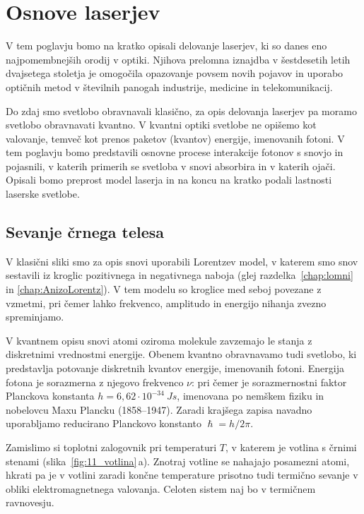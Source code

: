 
\chapter{Osnove laserjev}
V tem poglavju bomo na kratko opisali delovanje laserjev, ki so 
danes eno najpomembnejših orodij v optiki. Njihova prelomna
iznajdba v šestdesetih letih dvajsetega stoletja je omogočila
opazovanje povsem novih pojavov in uporabo optičnih metod
v številnih panogah industrije, medicine in telekomunikacij.

Do zdaj smo svetlobo obravnavali klasično, za
opis delovanja laserjev pa moramo svetlobo obravnavati kvantno. V kvantni optiki 
svetlobe ne opišemo kot valovanje, temveč kot 
prenos paketov (kvantov) energije, imenovanih fotoni. 
V tem poglavju bomo predstavili osnovne procese interakcije 
fotonov s snovjo in pojasnili, v katerih primerih se svetloba v snovi
absorbira in v katerih ojači. Opisali bomo preprost model laserja 
in na koncu na kratko podali lastnosti laserske svetlobe.

\section{Sevanje črnega telesa}
V klasični sliki smo za opis snovi uporabili Lorentzev model, 
v katerem smo snov sestavili iz kroglic pozitivnega in 
negativnega naboja (glej razdelka~\ref{chap:lomni} in 
\ref{chap:AnizoLorentz}).
V tem modelu so kroglice med seboj povezane z vzmetmi, pri čemer lahko
frekvenco, amplitudo in energijo nihanja zvezno spreminjamo.

V kvantnem opisu snovi atomi oziroma molekule zavzemajo
le stanja z diskretnimi vrednostmi energije. Obenem kvantno
obravnavamo tudi svetlobo, ki predstavlja potovanje diskretnih
kvantov energije, imenovanih fotoni. 
Energija fotona je sorazmerna z njegovo frekvenco $\nu$:
pri čemer je sorazmernostni faktor Planckova konstanta
$h = 6,62 \cdot 10^{-34}~\si{Js}$, imenovana 
po nemškem fiziku in nobelovcu Maxu Plancku (1858--1947).
Zaradi krajšega zapisa navadno uporabljamo reducirano Planckovo konstanto
$\hslash = h/2\pi$.

Zamislimo si toplotni zalogovnik pri temperaturi $T$, v katerem 
je votlina s črnimi stenami (slika~\ref{fig:11_votlina}\,a). 
Znotraj votline se nahajajo posamezni atomi, hkrati pa je v votlini zaradi 
končne temperature prisotno tudi termično sevanje v obliki 
elektromagnetnega valovanja. Celoten sistem naj bo v termičnem ravnovesju.


